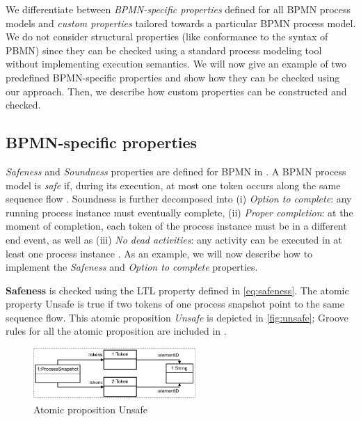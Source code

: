 \documentclass[submission, copyright, creativecommons]{eptcs}
\begin{document}
We differentiate between \emph{BPMN-specific properties} defined for all BPMN process models and \emph{custom properties} tailored towards a particular BPMN process model.
We do not consider structural properties (like conformance to the syntax of PBMN) since they can be checked using a standard process modeling tool without implementing execution semantics.
We will now give an example of two predefined BPMN-specific properties and show how they can be checked using our approach.
Then, we describe how custom properties can be constructed and checked.

\subsection{BPMN-specific properties}
\textit{Safeness} and \textit{Soundness} properties are defined for BPMN in \cite{corradiniClassificationBPMNCollaborations2018}.
A BPMN process model is \emph{safe} if, during its execution, at most one token occurs along the same sequence flow \cite{corradiniClassificationBPMNCollaborations2018}.
Soundness is further decomposed into (i) \emph{Option to complete}: any running process instance must eventually complete, (ii) \emph{Proper completion}: at the moment of completion, each token of the process instance must be in a different end event, as well as (iii) \emph{No dead activities}: any activity can be executed in at least one process instance \cite{corradiniClassificationBPMNCollaborations2018}.
As an example, we will now describe how to implement the \emph{Safeness} and \emph{Option to complete} properties.

\textbf{Safeness} is checked using the LTL property defined in \eqref{eq:safeness}.
The atomic property \textsf{Unsafe} is true if two tokens of one process snapshot point to the same sequence flow. This atomic proposition \textit{Unsafe} is depicted in \autoref{fig:unsafe}; Groove rules for all the atomic proposition are included in \cite{timkrauterArtifactsTERMGRAPH2022}.

\begin{figure}[h]
    \centering
    \includegraphics[width=0.55\textwidth]{images/bpmn_semantics-unsafe.pdf}
    \caption{Atomic proposition \textsf{Unsafe}}
    \label{fig:unsafe}
\end{figure}
\end{document}
